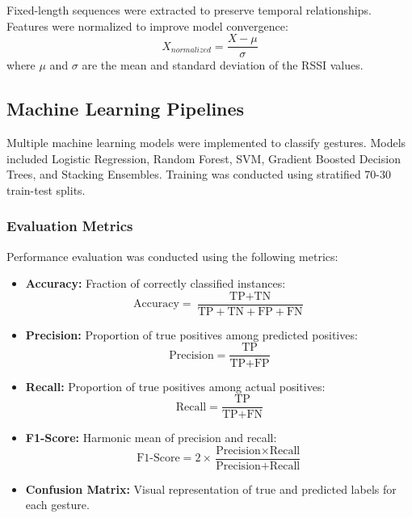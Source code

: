 \documentclass[10pt,twocolumn,letterpaper]{article}
\begin{document}
Fixed-length sequences were extracted to preserve temporal relationships. Features were normalized to improve model convergence:
\begin{equation}
    X_{normalized} = \frac{X - \mu}{\sigma}
\end{equation}
where \( \mu \) and \( \sigma \) are the mean and standard deviation of the RSSI values.

\subsection{Machine Learning Pipelines}

Multiple machine learning models were implemented to classify gestures. Models included Logistic Regression, Random Forest, SVM, Gradient Boosted Decision Trees, and Stacking Ensembles. Training was conducted using stratified 70-30 train-test splits.

\subsubsection{Evaluation Metrics}
Performance evaluation was conducted using the following metrics:
\begin{itemize}
    \item \textbf{Accuracy:} Fraction of correctly classified instances:
    \begin{equation}
        \text{Accuracy} = \frac{\text{TP} + \text{TN}}{\text{TP} + \text{TN} + \text{FP} + \text{FN}}
    \end{equation}
    
    \item \textbf{Precision:} Proportion of true positives among predicted positives:
    \begin{equation}
        \text{Precision} = \frac{\text{TP}}{\text{TP} + \text{FP}}
    \end{equation}
    
    \item \textbf{Recall:} Proportion of true positives among actual positives:
    \begin{equation}
        \text{Recall} = \frac{\text{TP}}{\text{TP} + \text{FN}}
    \end{equation}
    
    \item \textbf{F1-Score:} Harmonic mean of precision and recall:
    \begin{equation}
        \text{F1-Score} = 2 \times \frac{\text{Precision} \times \text{Recall}}{\text{Precision} + \text{Recall}}
    \end{equation}
    
    \item \textbf{Confusion Matrix:} Visual representation of true and predicted labels for each gesture.
\end{itemize}
\end{document}
